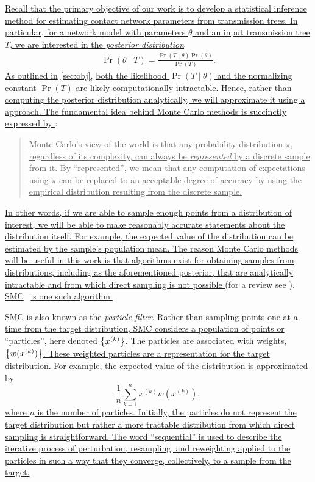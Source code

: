 {\color{blue}\uline{
Recall that the primary objective of our work is to develop a statistical
inference method for estimating contact network parameters from transmission
trees. In particular, for a network model with parameters $\theta$ and an input
transmission tree $T$, we are interested in the \emph{posterior distribution}}
\begin{align}
  \Pr(\theta \mid T) = \frac{\Pr(T \mid \theta) \Pr(\theta)}{\Pr(T)}.
  \label{eq:post}
\end{align}
\uline{As outlined in} \cref{sec:obj}, \uline{both the likelihood $\Pr(T \mid
\theta)$ and the normalizing constant $\Pr(T)$ are likely computationally
intractable. Hence, rather than computing the posterior distribution
analytically, we will approximate it using a  approach.
The fundamental idea behind Monte Carlo methods is succinctly expressed by
\textcite{liu2001theoretical}}:
\begin{quote}
    \uline{Monte Carlo's view of the world is that any probability distribution $\pi$, 
    regardless of its complexity, can always be \emph{represented} by a
    discrete sample from it. By ``represented'', we mean that any computation
    of expectations using $\pi$ can be replaced to an acceptable degree of
    accuracy by using the empirical distribution resulting from the discrete
    sample.}
\end{quote}
\uline{In other words, if we are able to sample enough points from a
distribution of interest, we will be able to make reasonably accurate
statements about the distribution itself. For example, the expected value of
the distribution can be estimated by the sample's population mean. The reason
Monte Carlo methods will be useful in this work is that algorithms exist for
obtaining samples from distributions, including as the aforementioned
posterior, that are analytically intractable and from which direct sampling is
not possible } (for a review see \autocite{robert2004monte}).
\uline{\Gls{SMC}}~\autocite{doucet2000sequential, doucet2001introduction,
liu2008monte} \uline{is one such algorithm.}
  
\uline{\Gls{SMC} is also known as the \emph{particle filter}. Rather than
sampling points one at a time from the target distribution, \gls{SMC} considers
a population of points or ``particles'', here denoted $\left\lbrace x^{(k)}\right\rbrace$. The
particles are associated with weights, $\left\lbrace w(x^{(k)})\right\rbrace$. These weighted
particles are a representation for the target distribution. For example, the 
expected value of the distribution is approximated by}
\[
  \frac{1}{n} \sum_{k=1}^n x^{(k)} w(x^{(k)}),
\]
\uline{where $n$ is the number of particles. Initially, the particles do not
represent the target distribution but rather a more tractable distribution from
which direct sampling is straightforward. The word ``sequential'' is used to
describe the iterative process of perturbation, resampling, and reweighting
applied to the particles in such a way that they converge, collectively, to a
sample from the target.}

}

